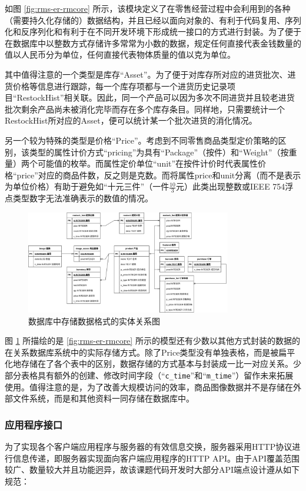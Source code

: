 如图 \ref{fig:rms-er-rmcore} 所示，该模块定义了在零售经营过程中会利用到的各种（需要持久化存储的）数据结构，并且已经以面向对象的、有利于代码复用、序列化和反序列化和有利于在不同开发环境下形成统一接口的方式进行封装。为了便于在数据库中以整数方式存储许多常常为小数的数据，规定任何直接代表金钱数量的值以人民币分为单位，任何直接代表物体质量的值以克为单位。

其中值得注意的一个类型是库存“Asset”。为了便于对库存所对应的进货批次、进货价格等信息进行跟踪，每一个库存项都与一个进货历史记录项目“RestockHist”相关联。因此，同一个产品可以因为多次不同进货并且较老进货批次剩余产品尚未被消化完毕而存在多个库存条目。同样地，只需要统计一个RestockHist所对应的Asset，便可以统计某一个批次进货的消化情况。

另一个较为特殊的类型是价格“Price”。考虑到不同零售商品类型定价策略的区别，该类型的属性计价方式“pricing”为具有“Package”（按件）和“Weight”（按重量）两个可能值的枚举。而属性定价单位“unit”在按件计价时代表属性价格“price”对应的商品件数，反之则是克数。而将属性price和unit分离（而不是表示为单位价格）有助于避免如“十元三件”（一件$\frac{10}{3}$元）此类出现整数或IEEE 754浮点类型数字无法准确表示的数值的情况。

\begin{figure}[htbp]
	\centering
	\includegraphics[width=0.8\textwidth]{./imgs/rms-db.png}
	\caption{数据库中存储数据格式的实体关系图}
	\label{fig:rms-db}
\end{figure}

图 \ref{fig:rms-db} 所描绘的是 \ref{fig:rms-er-rmcore} 所示的模型还有少数以其他方式封装的数据的在关系数据库系统中的实际存储方式。除了Price类型没有单独表格，而是被扁平化地存储在了各个表中的区别，数据存储的方式基本与封装成一比一对应关系。少部分表格具有额外的创建、修改时间字段（“\verb|c_time|”和“\verb|m_time|”）留作未来拓展使用。值得注意的是，为了改善大规模访问的效率，商品图像数据并不是存储在外部文件系统，而是和其他资料一同存储在数据库中。

\subsubsection{应用程序接口}
为了实现各个客户端应用程序与服务器的有效信息交换，服务器采用HTTP协议进行信息传递，即服务器实现面向客户端应用程序的HTTP API。由于API覆盖范围较广、数量较大并且功能迥异，故该课题代码开发时大部分API端点设计遵从如下规范：

